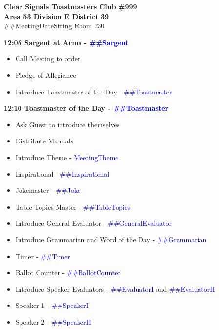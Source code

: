 \documentclass{article}
\newcommand{\meetingTheme}{MeetingTheme}
\newcommand{\meetingDateString}{##MeetingDateString}
\newcommand{\toastmaster}{##Toastmaster}
\newcommand{\sargent}{##Sargent}
\newcommand{\tableTopics}{##TableTopics}
\newcommand{\generalEvaluator}{##GeneralEvaluator}
\newcommand{\evaluatorI}{##EvaluatorI}
\newcommand{\evaluatorII}{##EvaluatorII}
\newcommand{\speakerI}{##SpeakerI}
\newcommand{\speakerII}{##SpeakerII}
\newcommand{\grammarian}{##Grammarian}
\newcommand{\timer}{##Timer}
\newcommand{\inspirational}{##Inspirational}
\newcommand{\ballotCounter}{##BallotCounter}
\newcommand{\joke}{##Joke}
\begin{document}
  \begin{spacing}{.8}
  \begin{center}
    {\bf Clear Signals Toastmasters Club \#999\\}
	{\bf Area 53 Division E District 39\\}
	\meetingDateString{} Room 230 \\ 
  \end{center}
  {\Large \bf12:05 Sargent at Arms - \textcolor{blue}{\sargent{}}}
  \begin{itemize}
    \item Call Meeting to order
    \item Pledge of Allegiance
    \item Introduce Toastmaster of the Day - \textcolor{blue}{\toastmaster{}}
  \end{itemize}
  {\Large \bf12:10 Toastmaster of the Day - \textcolor{blue}{\toastmaster{}}} 
  \begin{itemize}
    \item Ask Guest to introduce themselves
    \item Distribute Manuals
    \item Introduce Theme - \textcolor{blue}{\meetingTheme{}}
    \item Inspirational - \textcolor{blue}{\inspirational{}}
    \item Jokemaster - \textcolor{blue}{\joke{}}
	\item Table Topics Master - \textcolor{blue}{\tableTopics{}}
    \item Introduce General Evaluator - \textcolor{blue}{\generalEvaluator{}}
	\item Introduce Grammarian and Word of the Day - \textcolor{blue}{\grammarian{}}
    \item Timer - \textcolor{blue}{\timer{}}
    \item Ballot Counter - \textcolor{blue}{\ballotCounter{}}
    \item Introduce Speaker Evaluators - \textcolor{blue}{\evaluatorI{}} and \textcolor{blue}{\evaluatorII{}}
    \item Speaker 1 - \textcolor{blue}{\speakerI{}}
    \item Speaker 2 - \textcolor{blue}{\speakerII{}}

\end{itemize}
\end{spacing}
\end{document}
